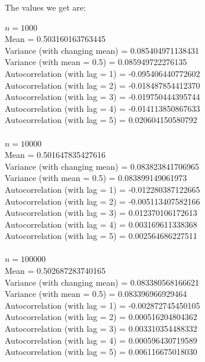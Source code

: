 \documentclass{article}
\begin{document}
The values we get are:

$n = 1000$\\
Mean = 0.503160163763445\\
Variance (with changing mean) = 0.085404971138431\\
Variance (with mean = 0.5) = 0.085949722276135\\
Autocorrelation (with lag = 1) = -0.095406440772602\\
Autocorrelation (with lag = 2) = -0.018487854412370\\
Autocorrelation (with lag = 3) = -0.019750444395744\\
Autocorrelation (with lag = 4) = -0.014113850867633\\
Autocorrelation (with lag = 5) = 0.020604150580792\\
\\
$n = 10000$\\
Mean = 0.501647835427616\\
Variance (with changing mean) = 0.083823841706965\\
Variance (with mean = 0.5) = 0.083899149061973\\
Autocorrelation (with lag = 1) = -0.012280387122665\\
Autocorrelation (with lag = 2) = -0.005113407582166\\
Autocorrelation (with lag = 3) = 0.012370106172613\\
Autocorrelation (with lag = 4) = 0.003169611338368\\
Autocorrelation (with lag = 5) = 0.002564686227511\\
\\
$n = 100000$\\
Mean = 0.502687283740165\\
Variance (with changing mean) = 0.083380568166621\\
Variance (with mean = 0.5) = 0.083396966929464\\
Autocorrelation (with lag = 1) = -0.002872745450105\\
Autocorrelation (with lag = 2) = 0.000516204804362\\
Autocorrelation (with lag = 3) = 0.003310354488332\\
Autocorrelation (with lag = 4) = 0.000596430719589\\
Autocorrelation (with lag = 5) = 0.006116675018030\\
\\
\pagebreak
\end{document}
